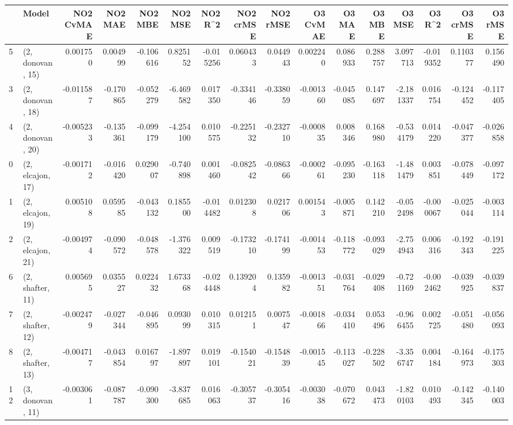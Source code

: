 \begin{tabular}{llrrrrrrrrrrrrrr}
\toprule
{} &             Model &  NO2 CvMAE &   NO2 MAE &   NO2 MBE &    NO2 MSE &   NO2 R\textasciicircum2 &  NO2 crMSE &  NO2 rMSE &  O3 CvMAE &    O3 MAE &    O3 MBE &     O3 MSE &    O3 R\textasciicircum2 &  O3 crMSE &   O3 rMSE \\
\midrule
5  &  (2, donovan, 15) &   0.001750 &  0.004999 & -0.106616 &   0.825152 & -0.015256 &   0.060433 &  0.044943 &  0.002240 &  0.086933 &  0.288757 &   3.097713 & -0.019352 &  0.110377 &  0.156490 \\
3  &  (2, donovan, 18) &  -0.011587 & -0.170865 & -0.052279 &  -6.469582 &  0.017350 &  -0.334146 & -0.338059 & -0.001360 & -0.045085 &  0.147697 &  -2.181337 &  0.016754 & -0.124452 & -0.117405 \\
4  &  (2, donovan, 20) &  -0.005233 & -0.135361 & -0.099179 &  -4.254100 &  0.010575 &  -0.225132 & -0.232710 & -0.000835 &  0.008346 &  0.168980 &  -0.534179 &  0.014220 & -0.047377 & -0.026858 \\
0  &  (2, elcajon, 17) &  -0.001712 & -0.016420 &  0.029007 &  -0.740898 &  0.001460 &  -0.082542 & -0.086366 & -0.000261 & -0.095230 & -0.163118 &  -1.481479 &  0.003851 & -0.078449 & -0.097172 \\
1  &  (2, elcajon, 19) &   0.005108 &  0.059585 & -0.043132 &   0.185500 & -0.014482 &   0.012308 &  0.021706 &  0.001543 & -0.005871 &  0.142210 &  -0.052498 & -0.000067 & -0.025044 & -0.003114 \\
2  &  (2, elcajon, 21) &  -0.004974 & -0.090572 & -0.048578 &  -1.376322 &  0.009519 &  -0.173210 & -0.174199 & -0.001453 & -0.118772 & -0.093029 &  -2.754943 &  0.006316 & -0.192343 & -0.191225 \\
6  &  (2, shafter, 11) &   0.005695 &  0.035527 &  0.022432 &   1.673368 & -0.024448 &   0.139204 &  0.135982 & -0.001351 & -0.031764 & -0.029408 &  -0.721169 & -0.002462 & -0.039925 & -0.039837 \\
7  &  (2, shafter, 12) &  -0.002479 & -0.027344 & -0.046895 &   0.093099 &  0.010315 &   0.012151 &  0.007547 & -0.001866 & -0.034410 &  0.053496 &  -0.966455 &  0.002725 & -0.051480 & -0.056093 \\
8  &  (2, shafter, 13) &  -0.004717 & -0.043854 &  0.016797 &  -1.897897 &  0.019101 &  -0.154021 & -0.154839 & -0.001545 & -0.113027 & -0.228502 &  -3.356747 &  0.004184 & -0.164973 & -0.175303 \\
12 &  (3, donovan, 11) &  -0.003061 & -0.087787 & -0.090300 &  -3.837685 &  0.016063 &  -0.305737 & -0.305416 & -0.003038 & -0.070672 &  0.043473 &  -1.820103 &  0.010493 & -0.142345 & -0.140003 \\

\end{tabular}

